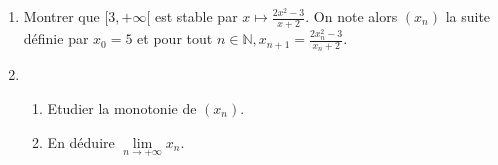 \documentclass[titlepage, twoside]{report}
\begin{document}
\begin{tcolorbox}[title=Exercice 3, title filled=false, colframe=darkgreen, colback=darkgreen!10!white]
    \begin{enumerate}
        \item Montrer que $[3, +\infty[$ est stable par $x\mapsto \frac{2x^2 - 3}{x + 2}$. On note alors $(x_n)$ la suite définie par $x_0 = 5$ et pour tout $n \in \mathbb{N}, x_{n+1} = \frac{2x_n^2 - 3}{x_n + 2}$. 
        \item \begin{enumerate}
            \item Etudier la monotonie de $(x_n)$.
            \item En déduire $\lim\limits_{n\to +\infty} x_n$.
        \end{enumerate}
    \end{enumerate}
\end{tcolorbox}
\end{document}
